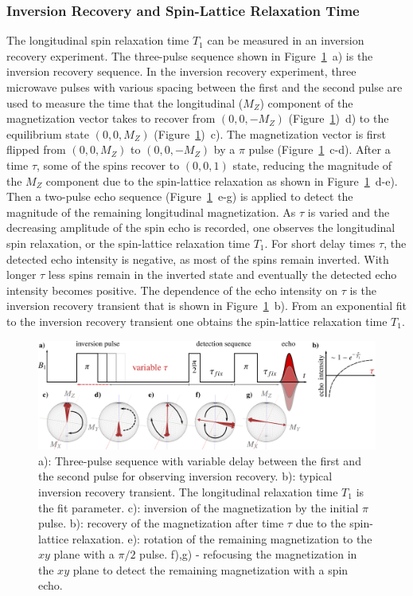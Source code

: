 \subsubsection{Inversion Recovery and Spin-Lattice Relaxation Time}
The longitudinal spin relaxation time $T_1$ can be measured in an inversion recovery experiment. The three-pulse sequence shown in Figure~\ref{fig:T1_diagram}~a) is the inversion recovery sequence. In the inversion recovery experiment, three microwave pulses with various spacing between the first and the second pulse are used to measure the time that the longitudinal ($M_Z$) component of the magnetization vector takes to recover from $(0,0,-M_Z)$ (Figure~\ref{fig:T1_diagram})~d) to the equilibrium state $(0,0,M_Z)$ (Figure~\ref{fig:T1_diagram})~c). The magnetization vector is first flipped from $(0,0,M_Z)$ to $(0,0,-M_Z)$ by a $\pi$ pulse (Figure~\ref{fig:T1_diagram}~c-d). After a time $\tau$, some of the spins recover to $(0,0,1)$ state, reducing the magnitude of the $M_Z$ component due to the spin-lattice relaxation as shown in Figure~\ref{fig:T1_diagram}~d-e). Then a two-pulse echo sequence (Figure~\ref{fig:T1_diagram}~e-g) is applied to detect the magnitude of the remaining longitudinal magnetization. As $\tau$ is varied and the decreasing amplitude of the spin echo is recorded, one observes the longitudinal spin relaxation, or the spin-lattice relaxation time $T_1$. For short delay times $\tau$, the detected echo intensity is negative, as most of the spins remain inverted. With longer $\tau$ less spins remain in the inverted state and eventually the detected echo intensity becomes positive. The dependence of the echo intensity on $\tau$ is the inversion recovery transient that is shown in Figure~\ref{fig:T1_diagram}~b). From an exponential fit to the inversion recovery transient one obtains the spin-lattice relaxation time $T_1$.

\begin{figure}[h]
\center
	\includegraphics[width=1\textwidth]{./epr_basics/inversion_recovery.pdf}
	\caption{a): Three-pulse sequence with variable delay between the first and the second pulse for observing inversion recovery. b): typical inversion recovery transient. The longitudinal relaxation time $T_1$ is the fit parameter. c): inversion of the magnetization by the initial $\pi$ pulse. b): recovery of the magnetization after time $\tau$ due to the spin-lattice relaxation. e): rotation of the remaining magnetization to the $xy$ plane with a $\pi/2$ pulse. f),g) - refocusing the magnetization in the $xy$ plane to detect the remaining magnetization with a spin echo.}
	\label{fig:T1_diagram}
\end{figure}
